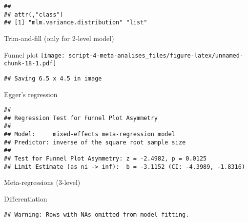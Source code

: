\documentclass[
]{article}
\begin{document}
\begin{verbatim}
## 
## attr(,"class")
## [1] "mlm.variance.distribution" "list"
\end{verbatim}

Trim-and-fill (only for 2-level model)

Funnel plot
\texttt{[image: script-4-meta-analises\_files/figure-latex/unnamed-chunk-18-1.pdf]}

\begin{verbatim}
## Saving 6.5 x 4.5 in image
\end{verbatim}

Egger's regression

\begin{verbatim}
## 
## Regression Test for Funnel Plot Asymmetry
## 
## Model:     mixed-effects meta-regression model
## Predictor: inverse of the square root sample size
## 
## Test for Funnel Plot Asymmetry: z = -2.4982, p = 0.0125
## Limit Estimate (as ni -> inf):  b = -3.1152 (CI: -4.3989, -1.8316)
\end{verbatim}

Meta-regressions (3-level)

Differentiation

\begin{verbatim}
## Warning: Rows with NAs omitted from model fitting.
\end{verbatim}
\end{document}
